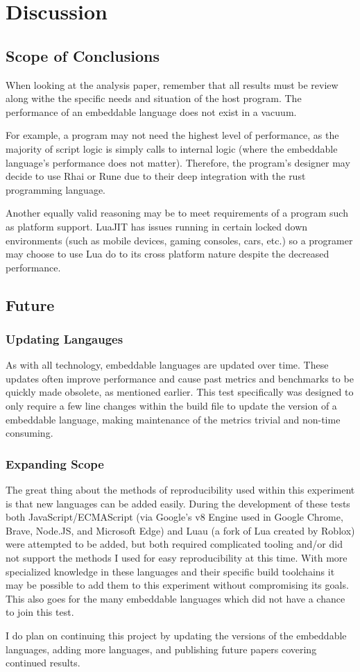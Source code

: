 \section{Discussion} \label{sec:discussion}

\subsection{Scope of Conclusions} \label{sec:discussion:importance}
When looking at the analysis paper, remember that all results must be review along withe the specific needs and situation of the host program. The performance of an embeddable language does not exist in a vacuum.

For example, a program may not need the highest level of performance, as the majority of script logic is simply calls to internal logic (where the embeddable language's performance does not matter). Therefore, the program's designer may decide to use Rhai or Rune due to their deep integration with the rust programming language.

Another equally valid reasoning may be to meet requirements of a program such as platform support. LuaJIT has issues running in certain locked down environments\cite{luajit:consoles} (such as mobile devices, gaming consoles, cars, etc.) so a programer may choose to use Lua do to its cross platform nature despite the decreased performance.

\subsection{Future}

\subsubsection{Updating Langauges}
As with all technology, embeddable languages are updated over time. These updates often improve performance and cause past metrics and benchmarks to be quickly made obsolete, as mentioned earlier. This test specifically was designed to only require a few line changes within the build file to update the version of a embeddable language, making maintenance of the metrics trivial and non-time consuming.

\subsubsection{Expanding Scope}
The great thing about the methods of reproducibility used within this experiment is that new languages can be added easily. During the development of these tests both JavaScript/ECMAScript (via Google's v8 Engine\cite{v8} used in Google Chrome, Brave, Node.JS, and Microsoft Edge) and Luau (a fork of Lua created by Roblox\cite{luau}) were attempted to be added, but both required complicated tooling and/or did not support the methods I used for easy reproducibility at this time. With more specialized knowledge in these languages and their specific build toolchains it may be possible to add them to this experiment without compromising its goals. This also goes for the many embeddable languages which did not have a chance to join this test.

I do plan on continuing this project by updating the versions of the embeddable languages, adding more languages, and publishing future papers covering continued results.
